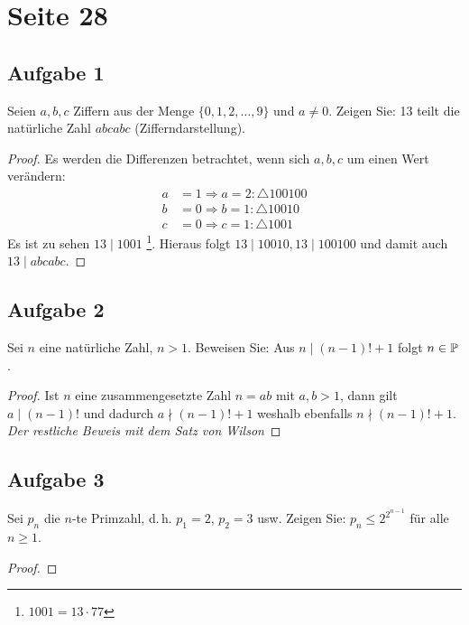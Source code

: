 \section{Seite 28}

\subsection{Aufgabe 1}
Seien $a,b,c$ Ziffern aus der Menge $\{0,1,2,\dotsc,9\}$ und $a \neq 0$.
Zeigen Sie: 13 teilt die natürliche Zahl $abcabc$ (Zifferndarstellung).
\begin{proof}
  Es werden die Differenzen betrachtet, wenn sich $a, b, c$ um einen Wert verändern:
  \begin{align*}
    a & = 1 \Rightarrow a = 2: \triangle 100100 \\
    b & = 0 \Rightarrow b = 1: \triangle 10010  \\
    c & = 0 \Rightarrow c = 1: \triangle 1001
  \end{align*}
  Es ist zu sehen $13 \mid 1001$ \footnote{$1001 = 13 \cdot 77$}.
  Hieraus folgt $13 \mid 10010, 13 \mid 100100$ und damit auch $13 \mid abcabc$.
\end{proof}

\newpage
\subsection{Aufgabe 2}
Sei $n$ eine natürliche Zahl, $n > 1$. Beweisen Sie: Aus $n \mid (n - 1)! + 1$
folgt $n \in \mathbb{P}$.
\begin{proof}
  Ist $n$ eine zusammengesetzte Zahl $n = ab$ mit $a,b > 1$, dann gilt
  $a \mid (n - 1)!$ und dadurch $a \nmid (n - 1)! + 1$ weshalb ebenfalls
  $n \nmid (n - 1)! + 1$. \\[4pt]
  \emph{Der restliche Beweis mit dem Satz von Wilson}
\end{proof}

\newpage
\subsection{Aufgabe 3}
Sei $p_n$ die $n$-te Primzahl, d.\,h. $p_1 = 2$, $p_2 = 3$ usw. Zeigen Sie:
$p_n \leq 2^{2^{n - 1}}$ für alle $n \geq 1$.
\begin{proof}
\end{proof}

\newpage
